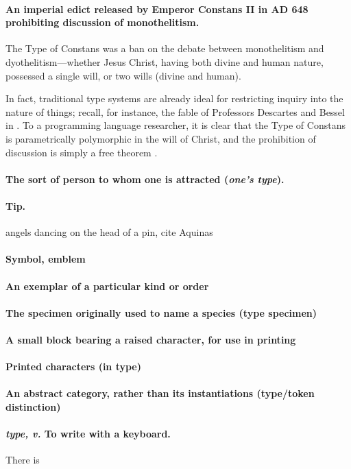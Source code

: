 \documentclass[10pt]{article}
\begin{document}
\paragraph{An imperial edict released by Emperor Constans II in AD 648
prohibiting discussion of monothelitism.}

The Type of Constans was a ban on the debate between monothelitism and
dyothelitism---whether Jesus Christ, having both divine and human nature,
possessed a single will, or two wills (divine and human).

In fact, traditional type systems are already ideal for restricting inquiry into
the nature of things; recall, for instance, the fable of Professors Descartes
and Bessel in \citet{reynolds83}. To a programming language researcher, it is
clear that the Type of Constans is parametrically polymorphic in the will of
Christ, and the prohibition of discussion is simply a free theorem
\citep{wadler89}.

\paragraph{The sort of person to whom one is attracted (\emph{one's type}).}

\paragraph{Tip.}

angels dancing on the head of a pin, cite Aquinas

\paragraph{Symbol, emblem}

\paragraph{An exemplar of a particular kind or order}

\paragraph{The specimen originally used to name a species (type specimen)}

\paragraph{A small block bearing a raised character, for use in printing}

\paragraph{Printed characters (in type)}

\paragraph{An abstract category, rather than its instantiations (type/token distinction)}

\paragraph{\emph{type, v.} To write with a keyboard.}

There is
\citep{noyes83}

\printbibliography
\end{document}
